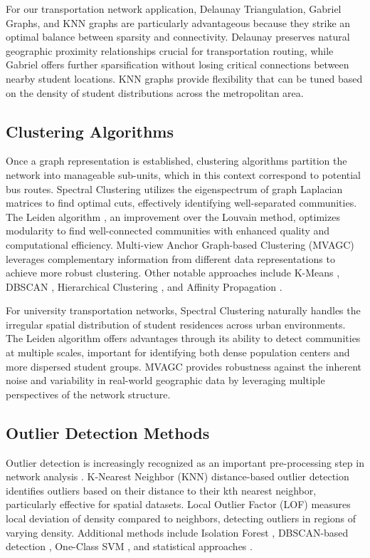 For our transportation network application, Delaunay Triangulation, Gabriel Graphs, and KNN graphs are particularly advantageous because they strike an optimal balance between sparsity and connectivity. Delaunay preserves natural geographic proximity relationships crucial for transportation routing, while Gabriel offers further sparsification without losing critical connections between nearby student locations. KNN graphs provide flexibility that can be tuned based on the density of student distributions across the metropolitan area.

\subsection{Clustering Algorithms}
Once a graph representation is established, clustering algorithms partition the network into manageable sub-units, which in this context correspond to potential bus routes. Spectral Clustering \cite{ng2001spectral} utilizes the eigenspectrum of graph Laplacian matrices to find optimal cuts, effectively identifying well-separated communities. The Leiden algorithm \cite{leiden}, an improvement over the Louvain method, optimizes modularity to find well-connected communities with enhanced quality and computational efficiency. Multi-view Anchor Graph-based Clustering (MVAGC) \cite{wang2019multi} leverages complementary information from different data representations to achieve more robust clustering. Other notable approaches include K-Means \cite{arthur2007k}, DBSCAN \cite{ester1996density}, Hierarchical Clustering \cite{murtagh2012algorithms}, and Affinity Propagation \cite{frey2007clustering}.

For university transportation networks, Spectral Clustering naturally handles the irregular spatial distribution of student residences across urban environments. The Leiden algorithm offers advantages through its ability to detect communities at multiple scales, important for identifying both dense population centers and more dispersed student groups. MVAGC provides robustness against the inherent noise and variability in real-world geographic data by leveraging multiple perspectives of the network structure.

\subsection{Outlier Detection Methods}
Outlier detection is increasingly recognized as an important pre-processing step in network analysis \cite{lu2020outlier}. K-Nearest Neighbor (KNN) distance-based outlier detection \cite{knn_outlier} identifies outliers based on their distance to their kth nearest neighbor, particularly effective for spatial datasets. Local Outlier Factor (LOF) \cite{breunig2000lof} measures local deviation of density compared to neighbors, detecting outliers in regions of varying density. Additional methods include Isolation Forest \cite{liu2008isolation}, DBSCAN-based detection \cite{ester1996density}, One-Class SVM \cite{scholkopf1999support}, and statistical approaches \cite{barnett1994outliers}.

